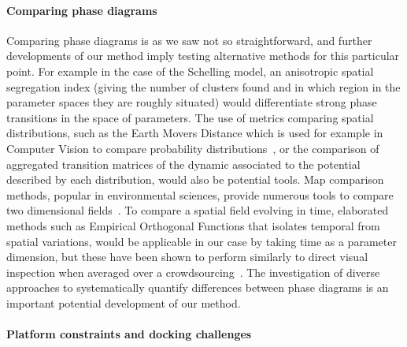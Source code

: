 \documentclass[preprint,5p,times,twocolumn,authoryear]{elsarticle}
\begin{document}
\paragraph{Comparing phase diagrams} Comparing phase diagrams is as we saw not so straightforward, and further developments of our method imply testing alternative methods for this particular point. For example in the case of the Schelling model, an anisotropic spatial segregation index (giving the number of clusters found and in which region in the parameter spaces they are roughly situated) would differentiate strong  phase transitions in the space of  parameters. The use of metrics comparing spatial distributions, such as the Earth Movers Distance which is used for example in Computer Vision to compare probability distributions~\citep{rubner2000earth}, or the comparison of aggregated transition matrices of the dynamic associated to the potential described by each distribution, would also be potential tools. Map comparison methods, popular in environmental sciences, provide numerous tools to compare two dimensional fields~\citep{visser2006map,kuhnert2005comparing}. To compare a spatial field evolving in time, elaborated methods such as Empirical Orthogonal Functions that isolates temporal from spatial variations, would be applicable in our case by taking time as a parameter dimension, but these have been shown to perform similarly to direct visual inspection when averaged over a crowdsourcing~\citep{10.1371/journal.pone.0178165}.  The investigation of diverse approaches to systematically quantify differences between phase diagrams is an important potential development of our method.

\paragraph{Platform constraints and docking challenges}
\end{document}
